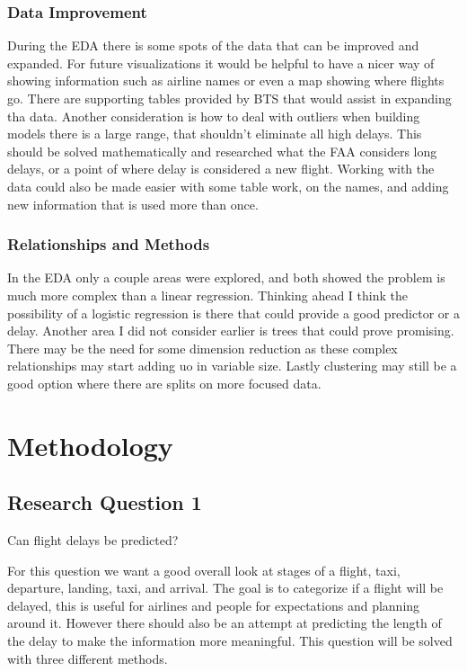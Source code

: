 \documentclass[a4paper,12pt]{article}
\begin{document}
\subsubsection{Data Improvement}
During the EDA there is some spots of the data that can be improved and expanded. For future visualizations it would be helpful to have a nicer way of showing information
such as airline names or even a map showing where flights go. There are supporting tables provided by BTS that would assist in expanding tha data. Another consideration is how to deal with outliers when building models
there is a large range, that shouldn't eliminate all high delays. This should be solved mathematically and researched what the FAA considers long delays, or a point of where delay is considered a new flight. Working with the data 
could also be made easier with some table work, on the names, and adding new information that is used more than once.

\subsubsection{Relationships and Methods}
In the EDA only a couple areas were explored, and both showed the problem is much more complex than a linear regression. Thinking ahead I think the possibility of a logistic regression is there that could provide a good predictor or a delay.
Another area I did not consider earlier is trees that could prove promising. There may be the need for some dimension reduction as these complex relationships may start adding uo in variable size. Lastly clustering may still be a good option where there are splits on more focused data.

\pagebreak

\section{Methodology}

\subsection{Research Question 1}
Can flight delays be predicted?

For this question we want a good overall look at stages of a flight, taxi, departure, landing, taxi, and arrival. The goal is to categorize if a flight will be delayed,
this is useful for airlines and people for expectations and planning around it. However there should also be an attempt at predicting the length of the delay to make 
the information more meaningful. This question will be solved with three different methods.
\end{document}
